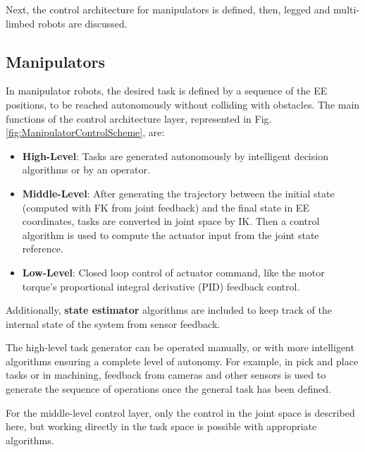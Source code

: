 Next, the control architecture for manipulators is defined, then, legged and multi-limbed robots are discussed.  

\subsection{Manipulators}
\label{sec:manipulatorControl}

In manipulator robots, the desired task is defined by a sequence of the EE positions, to be reached autonomously without colliding with obstacles. The main functions of the control architecture layer, represented in Fig.\ref{fig:ManipulatorControlScheme}, are: 
\begin{itemize}
    \setlength\itemsep{-0.7em} 
    \item \textbf{High-Level}: Tasks are generated autonomously by intelligent decision algorithms or by an operator.
    \item \textbf{Middle-Level}:  After generating the trajectory between the initial state (computed with FK from joint feedback) and the final state in EE coordinates, tasks are converted in joint space by IK. Then a control algorithm is used to compute the actuator input from the joint state reference.  
    \item \textbf{Low-Level}: Closed loop control of actuator command, like the motor torque's proportional integral derivative (PID) feedback control. 
\end{itemize}

Additionally, \textbf{state estimator} algorithms are included to keep track of the internal state of the system from sensor feedback.

The high-level task generator can be operated manually, or with more intelligent algorithms ensuring a complete level of autonomy. 
For example, in pick and place tasks or in machining, feedback from cameras and other sensors is used to generate the sequence of operations once the general task has been defined\cite{CorkeMATLAB}. 

For the middle-level control layer, only the control in the joint space is described here, but working directly in the task space is possible with appropriate algorithms\cite{Siciliano}. 

